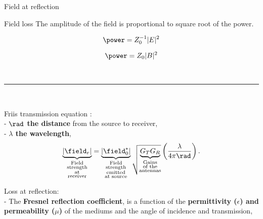 \documentclass[8pt]{beamer}
\begin{document}
\begin{frame}{Field at reflection}
\vspace{-0.5cm}
\begin{block}{Field loss}
The amplitude of the field is proportional to square root of the power. %
\begin{minipage}{\twocols}
\begin{equation}
\power=Z_0^{-1}|E|^2
\end{equation}
\end{minipage}%
\begin{minipage}{\sepwid}
\mbox{}
\end{minipage}%
\begin{minipage}{\twocols}
\begin{equation}
\power=Z_0|B|^2
\end{equation}
\end{minipage}%
\\
\noindent\rule{\linewidth}{0.4pt}%
\\
\begin{minipage}{\twocols}
\vspace{-1cm}
Friis transmission equation \footnotemark[1]: \\
- \textbf{$\rad$ the distance} from the source to receiver, 
\\-  \textbf{$\lambda$ the wavelength},
\begin{equation*}
\underbrace{|\field_r|}_{\substack{\text{Field} \\ \text{strength} \\ \text{at} \\ \text{receiver}}}=\underbrace{|\field_0^*|}_{\substack{\text{Field} \\ \text{strength} \\ \text{emitted} \\ \text{at source}}}\sqrt{\underbrace{G_TG_R}_{\substack{\text{Gains} \\\text{of the} \\  \text{antennas}}}} \left(\frac{\lambda}{4 \pi \rad} \right).
\end{equation*}
\end{minipage}%
\begin{minipage}{\sepwid}
\mbox{}
\end{minipage}%
\begin{minipage}{\twocols}
Loss at reflection:
\\- The \textbf{Fresnel reflection coefficient\footnotemark[1]}, is a function of the \textbf{permittivity ($\epsilon$) and permeability ($\mu$)} of the mediums and the angle of incidence and transmission,

\end{minipage}
\end{block}
\end{frame}
\end{document}
